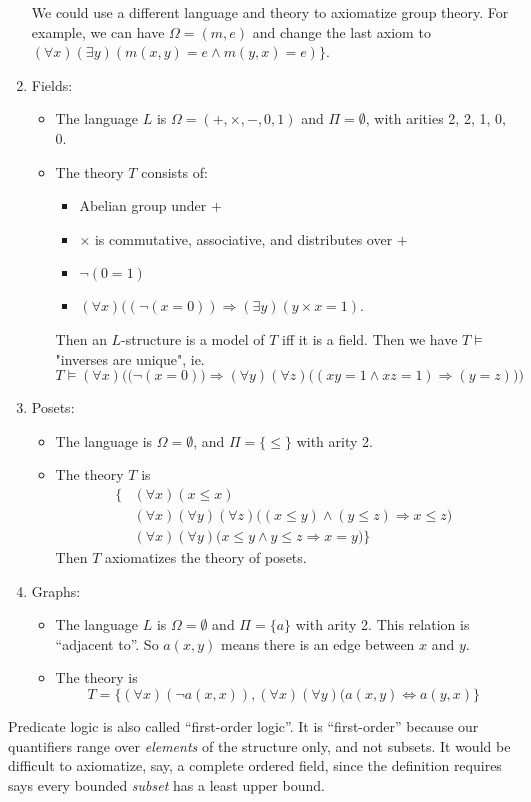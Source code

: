 \documentclass[a4paper]{article}
\begin{document}
\begin{eg}
\begin{enumerate}
    \note We could use a different language and theory to axiomatize group theory. For example, we can have $\Omega = (m, e)$ and change the last axiom to $(\forall x)(\exists y)(m(x, y) = e\wedge m(y, x) = e)\}$.
  \item Fields:
    \begin{itemize}
      \item The language $L$ is $\Omega = (+, \times, -, 0, 1)$ and $\Pi = \emptyset$, with arities 2, 2, 1, 0, 0.
      \item The theory $T$ consists of:
        \begin{itemize}
          \item Abelian group under $+$
          \item $\times$ is commutative, associative, and distributes over $+$
          \item $\neg (0 = 1)$
          \item $(\forall x)((\neg(x = 0)) \Rightarrow  (\exists y)(y\times x = 1)$.
        \end{itemize}
        Then an $L$-structure is a model of $T$ iff it is a field. Then we have $T\models$ "inverses are unique", ie.
        \[
          T\models (\forall x)\Big(\big(\neg(x = 0)\big) \Rightarrow (\forall y)(\forall z)\big((xy = 1 \wedge xz = 1)\Rightarrow (y = z)\big)\Big)
        \]
    \end{itemize}
  \item Posets:
    \begin{itemize}
      \item The language is $\Omega = \emptyset$, and $\Pi=\{\leq\}$ with arity 2.
      \item The theory $T$ is
        \begin{align*}
          \{& (\forall x)(x \leq x)\\
            & (\forall x)(\forall y)(\forall z)\big((x \leq y)\wedge(y \leq z) \Rightarrow x \leq z\big)\\
          & (\forall x)(\forall y)\big(x \leq y \wedge y \leq z \Rightarrow x = y\big)\}
        \end{align*}
        Then $T$ axiomatizes the theory of posets.
    \end{itemize}
  \item Graphs:
    \begin{itemize}
      \item The language $L$ is $\Omega = \emptyset$ and $\Pi = \{a\}$ with arity 2. This relation is ``adjacent to''. So $a(x, y)$ means there is an edge between $x$ and $y$.
      \item The theory is
        \[
          T = \{(\forall x)(\neg a(x, x)), (\forall x)(\forall y)(a(x, y)\Leftrightarrow a(y, x)\}
        \]
    \end{itemize}
\end{enumerate}
Predicate logic is also called ``first-order logic''. It is ``first-order'' because our quantifiers range over \emph{elements} of the structure only, and not subsets. It would be difficult to axiomatize, say, a complete ordered field, since the definition requires says every bounded \emph{subset} has a least upper bound.
\end{eg}
\end{document}
